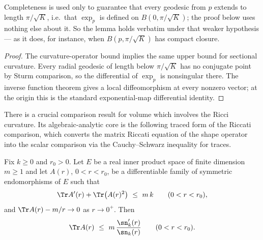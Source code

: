 Completeness is used only to guarantee that every geodesic from $p$
extends to length $\pi/\sqrt K$, i.e.\ that $\exp_p$ is defined on
$B(0,\pi/\sqrt K)$; the proof below uses nothing else about it. So
the lemma holds verbatim under that weaker hypothesis --- as it does,
for instance, when $B(p,\pi/\sqrt K)$ has compact closure.

\begin{proof}
\sketch
{}
The curvature-operator bound implies the same upper bound for sectional curvature. Every radial geodesic of length below $\pi/\sqrt K$ has no conjugate point by Sturm comparison, so the differential of $\exp_p$ is nonsingular there. The inverse function theorem gives a local diffeomorphism at every nonzero vector; at the origin this is the standard exponential-map differential identity.
\end{proof}


There is a crucial comparison result for volume which involves the
Ricci curvature. Its algebraic-analytic core is the following traced
form of the Riccati comparison, which converts the matrix Riccati
equation of the shape operator into the scalar comparison via the
Cauchy--Schwarz inequality for traces.

\begin{lemma}
\label{lem:trace-riccati-comparison}
\leanok



Fix $k\ge0$ and $r_0>0$. Let $E$ be a real inner product space of
finite dimension $m\ge1$ and let $A(r)$, $0<r<r_0$, be a
differentiable family of symmetric endomorphisms of $E$ such that
$$\Tr A'(r)+\Tr\!\left(A(r)^2\right)\ \le\ m\,k
\qquad(0<r<r_0),$$
and $\Tr A(r)-m/r\to0$ as $r\to0^+$. Then
$$\Tr A(r)\ \le\ m\,\frac{\sn_k'(r)}{\sn_k(r)}\qquad(0<r<r_0).$$
\end{lemma}


